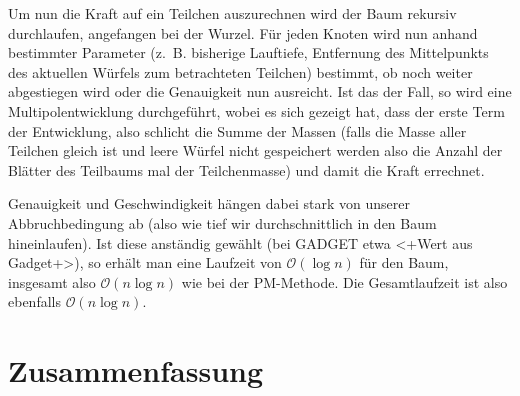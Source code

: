 \documentclass[a4paper]{scrartcl}
\begin{document}
Um nun die Kraft auf ein Teilchen auszurechnen wird der Baum rekursiv
durchlaufen, angefangen bei der Wurzel. Für jeden Knoten wird nun anhand
bestimmter Parameter (z.~B. bisherige Lauftiefe, Entfernung des Mittelpunkts des
aktuellen Würfels zum betrachteten Teilchen) bestimmt, ob noch weiter
abgestiegen wird oder die Genauigkeit nun ausreicht. Ist das der Fall, so wird
eine Multipolentwicklung durchgeführt, wobei es sich gezeigt hat, dass der erste
Term der Entwicklung, also schlicht die Summe der Massen (falls die Masse aller
Teilchen gleich ist und leere Würfel nicht gespeichert werden also die Anzahl
der Blätter des Teilbaums mal der Teilchenmasse) und damit die Kraft errechnet.

Genauigkeit und Geschwindigkeit hängen dabei stark von unserer Abbruchbedingung
ab (also wie tief wir durchschnittlich in den Baum hineinlaufen). Ist diese
anständig gewählt (bei GADGET etwa <+Wert aus Gadget+>\cite{gadget-abbruch}), so
erhält man eine Laufzeit von $\mathcal{O}(\log n)$ für den Baum, insgesamt also
$\mathcal O(n\log n)$ wie bei der PM-Methode. Die Gesamtlaufzeit ist also
ebenfalls $\mathcal O(n\log n)$.

\section{Zusammenfassung}

\end{document}
